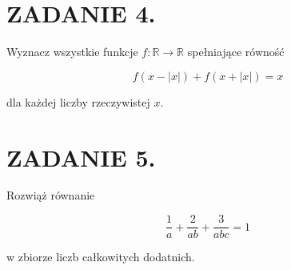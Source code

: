 \documentclass[10pt]{article}
\begin{document}
\section*{ZADANIE 4.}
Wyznacz wszystkie funkcje \(f: \mathbb{R} \rightarrow \mathbb{R}\) spełniające równość

\[
f(x-|x|)+f(x+|x|)=x
\]

dla każdej liczby rzeczywistej \(x\).

\section*{ZADANIE 5.}
Rozwiąż równanie

\[
\frac{1}{a}+\frac{2}{a b}+\frac{3}{a b c}=1
\]

w zbiorze liczb całkowitych dodatnich.
\end{document}
